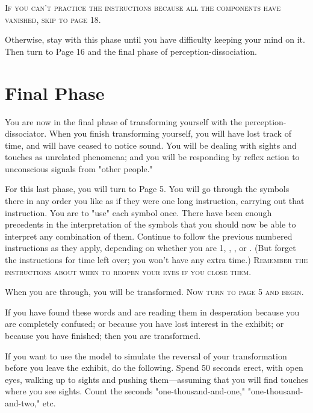 {\begin{enumerate}
\vfill

\textsc{If you can't practice the instructions because all the components have vanished, skip to page 18.}

\vfill

Otherwise, stay with this phase until you have difficulty keeping your 
mind on it. Then turn to Page 16 and the final phase of 
perception-dissociation. 

\vfill
\end{enumerate}

\clearpage
{}

\vfill
\section{Final Phase}

\vfill
You are now in the final phase of transforming yourself with the 
perception-dissociator. When you finish transforming yourself, you will have 
lost track of time, and will have ceased to notice sound. You will be dealing 
with sights and touches as unrelated phenomena; and you will be responding 
by reflex action to unconscious signals from "other people." 

For this last phase, you will turn to Page 5. You will go through the 
symbols there in any order you like as if they were one long instruction, 
carrying out that instruction. You are to "use" each symbol once. There 
have been enough precedents in the interpretation of the symbols that you 
should now be able to interpret any combination of them. Continue to 
follow the previous numbered instructions as they apply, depending on 
whether you are 1, , , or . 
(But forget the instructions for time left 
over; you won't have any extra time.) 
\textsc{Remember the instructions about when to reopen your eyes if you close them.}

When you are through, you will be transformed. 
\textsc{Now turn to page 5 and begin.}

\vfill

\clearpage
{}

\vfill

If you have found these words and are reading them in desperation 
because you are completely confused; or because you have lost interest in 
the exhibit; or because you have finished; then you are transformed. 


If you want to use the model to simulate the reversal of your 
transformation before you leave the exhibit, do the following. Spend 50 
seconds erect, with open eyes, walking up to sights and pushing 
them---assuming that you will find touches where you see sights. Count the 
seconds "one-thousand-and-one," "one-thousand-and-two," etc. 


}
